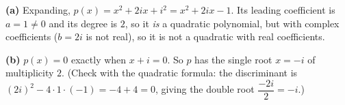 \textbf{(a)} Expanding, $p(x)=x^2+2ix+i^2=\boxed{x^2+2ix-1}$. Its leading coefficient is $a=1\ne0$ and its degree is $2$, so it \emph{is} a quadratic polynomial, but with complex coefficients ($b=2i$ is not real), so it is not a quadratic with real coefficients.

\textbf{(b)} $p(x)=0$ exactly when $x+i=0$. So $p$ has the single root $\boxed{x=-i}$ of multiplicity $2$. (Check with the quadratic formula: the discriminant is $(2i)^2-4\cdot1\cdot(-1)=-4+4=0$, giving the double root $\dfrac{-2i}{2}=-i$.)
